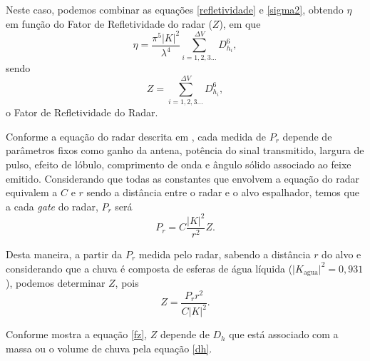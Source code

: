 Neste caso, podemos combinar as equações \ref{refletividade} e \ref{sigma2}, obtendo $\eta$ em função do Fator de Refletividade  do radar ($Z$), em que 
\begin{equation}
\eta =  \dfrac{\pi^5 |K|^2  }{ \lambda^4 } \sum_{i=1, 2, 3 ... }^{\Delta V} D_{h_i}^6,
\end{equation}
sendo 
\begin{equation}
Z =  \sum_{i=1, 2, 3 ... }^{\Delta V}  D_{h_i}^6,
\label{fz}
\end{equation}
o Fator de Refletividade do Radar.

Conforme a equação do radar descrita em , cada medida de $P_r$ depende de parâmetros fixos como ganho da antena, potência do sinal transmitido, largura de pulso, efeito de lóbulo, comprimento de onda e ângulo sólido associado ao feixe emitido. Considerando que todas as constantes que envolvem a equação do radar equivalem a $C$ e $r$ sendo a distância entre o radar e o alvo espalhador, temos que a cada \textit{gate} do radar, $P_r$ será  
\begin{equation}
P_r = C \dfrac{|K|^2}{r^2}  Z .
\end{equation}

Desta maneira, a partir da $P_r$ medida pelo radar, sabendo a distância $r$ do alvo e considerando que a chuva é composta de esferas de água líquida ($\vert K_{\mathrm{agua}}\vert^2=0,931$), podemos determinar $Z$, pois  
\begin{equation}
Z = \dfrac{P_r r^2}{C |K|^2}.
\label{zsimples}
\end{equation}

Conforme mostra a equação \ref{fz}, $Z$ depende de $D_h$ que está associado com a massa ou o volume de chuva pela equação \ref{dh}.


